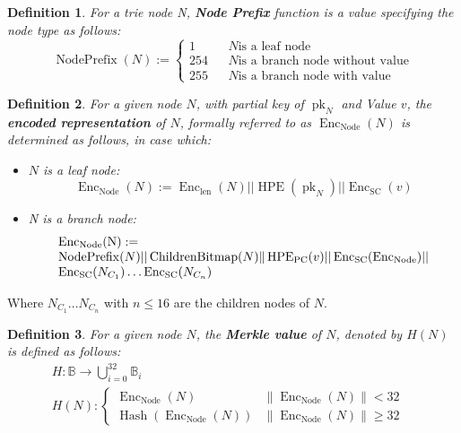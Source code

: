 \documentclass{article}
\newcommand{\assign}{:=}
\newcommand{\nobracket}{}
\newcommand{\nosymbol}{}
\newcommand{\tmop}[1]{\ensuremath{\operatorname{#1}}}
\newcommand{\tmrsub}[1]{\ensuremath{_{\textrm{#1}}}}
\newcommand{\tmstrong}[1]{\textbf{#1}}
\newcommand{\tmtextbf}[1]{{\bfseries{#1}}}
\newtheorem{definition}{Definition}
\providecommand{\nobracket}{}
\providecommand{\nosymbol}{}
\providecommand{\tmop}[1]{\ensuremath{\mathrm{#1}}}
\providecommand{\tmrsub}[1]{\tmrsub{\ensuremath{\mathrm{#1}}}}
\providecommand{\tmstrong}[1]{\tmtextbf{#1}}
\providecommand{\tmtextbf}[1]{\tmtextbf{#1}}
\newtheorem{definition}{Definition}
\begin{document}
\begin{definition}
  \label{def-node-prefix}For a trie node N, {\tmstrong{Node Prefix }}function
  is a value specifying the node type as follows:
  \[ \tmop{NodePrefix} (N) \assign \left\{ \begin{array}{lll}
       1 &  & N \text{is a leaf node}\\
       254 &  & N \text{is a branch node without value}\\
       255 &  & N \text{is a branch node with value}
     \end{array} \right. \]
\end{definition}

\begin{definition}
  For a given node $N$, with partial key of $\tmop{pk}_N$ and Value $v$, the
  {\tmstrong{encoded representation}} of $N$, formally referred to as
  $\tmop{Enc}_{\tmop{Node}} (N)$ is determined as follows, in case which:
  \begin{itemize}
    \item $N$ is a leaf node:
    \[ \tmop{Enc}_{\tmop{Node}} (N) \assign \tmop{Enc}_{\tmop{len}} (N) ||
       \tmop{HPE} (\tmop{pk}_N) || \tmop{Enc}_{\tmop{SC}} (v) \]
    \item N is a branch node:
    \[ \begin{array}{l}
         \text{Enc\tmrsub{Node}(N)} \assign\\
         \nobracket \tmop{NodePrefix} (N) || \tmop{ChildrenBitmap} (N) \|
         \tmop{HPE}_{\tmop{PC}} (v) || \tmop{Enc}_{\tmop{SC}}
         (\tmop{Enc}_{\tmop{Node}}) ||\\
         \tmop{Enc}_{\tmop{SC}} (N_{C_1}) \ldots \tmop{Enc}_{\tmop{SC}}
         (N_{C_n})
       \end{array} \]
  \end{itemize}
\end{definition}

Where $N_{C_1} \ldots N_{C_n}$ with $n \leqslant 16$ are the children nodes of
$N$.

\begin{definition}
  For a given node $N$, the {\tmstrong{Merkle value}} of $N$, denoted by $H
  (N)$ is defined as follows:
  \[ \begin{array}{lll}
       & H : \mathbb{B} \rightarrow \bigcup_{i = 0^{\nosymbol}}^{32}
       \mathbb{B}_i & \\
       & H (N) : \left\{ \begin{array}{lll}
         \tmop{Enc}_{\tmop{Node}} (N) & \| \tmop{Enc}_{\tmop{Node}} (N)\|< 32
         & \\
         \tmop{Hash} (\tmop{Enc}_{\tmop{Node}} (N)) & \|
         \tmop{Enc}_{\tmop{Node}} (N)\| \geqslant 32 & 
       \end{array} \right. & 
     \end{array} \]
\end{definition}
\end{document}
